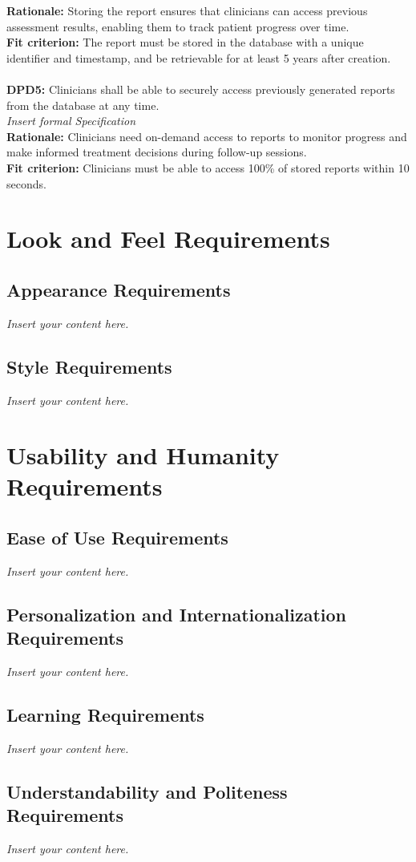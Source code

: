 \documentclass[12pt]{article}
\newcommand{\lips}{\textit{Insert your content here.}}
\begin{document}
\textbf{Rationale: }Storing the report ensures that clinicians can access previous assessment results, enabling them to track patient progress over time.\\
\textbf{Fit criterion: }The report must be stored in the database with a unique identifier and timestamp, and be retrievable for at least 5 years after creation.\\
\\
\noindent\textbf{DPD5: }Clinicians shall be able to securely access previously generated reports from the database at any time.\\
\textit{Insert formal Specification}\\
\textbf{Rationale: }Clinicians need on-demand access to reports to monitor progress and make informed treatment decisions during follow-up sessions.\\
\textbf{Fit criterion: }Clinicians must be able to access 100\% of stored reports within 10 seconds.\\

\section{Look and Feel Requirements}
\subsection{Appearance Requirements}
\lips
\subsection{Style Requirements}
\lips

\section{Usability and Humanity Requirements}
\subsection{Ease of Use Requirements}
\lips
\subsection{Personalization and Internationalization Requirements}
\lips
\subsection{Learning Requirements}
\lips
\subsection{Understandability and Politeness Requirements}
\lips
\end{document}
